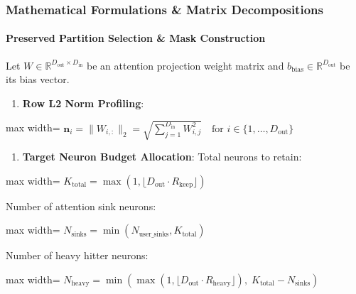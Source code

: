 \subsubsection*{Mathematical Formulations \& Matrix Decompositions}

\paragraph{Preserved Partition Selection \& Mask Construction}

Let $W \in \mathbb{R}^{D_{\text{out}} \times D_{\text{in}}}$ be an attention projection weight matrix and $b_{\text{bias}} \in \mathbb{R}^{D_{\text{out}}}$ be its bias vector.

\begin{enumerate}
\item \textbf{Row L2 Norm Profiling}:
\end{enumerate}
\begin{center}
\begin{adjustbox}{max width=\columnwidth}
$\displaystyle
\mathbf{n}_i = \| W_{i, :} \|_2 = \sqrt{ \sum_{j=1}^{D_{\text{in}}} W_{i, j}^2 } \quad \text{for } i \in \{1, \dots, D_{\text{out}}\}
$
\end{adjustbox}
\end{center}

\begin{enumerate}
\item \textbf{Target Neuron Budget Allocation}:
Total neurons to retain:
\end{enumerate}
\begin{center}
\begin{adjustbox}{max width=\columnwidth}
$\displaystyle
K_{\text{total}} = \max\left(1, \lfloor D_{\text{out}} \cdot R_{\text{keep}} \rfloor\right)
$
\end{adjustbox}
\end{center}
Number of attention sink neurons:
\begin{center}
\begin{adjustbox}{max width=\columnwidth}
$\displaystyle
N_{\text{sinks}} = \min(N_{\text{user\_sinks}}, K_{\text{total}})
$
\end{adjustbox}
\end{center}
Number of heavy hitter neurons:
\begin{center}
\begin{adjustbox}{max width=\columnwidth}
$\displaystyle
N_{\text{heavy}} = \min\left( \max\left(1, \lfloor D_{\text{out}} \cdot R_{\text{heavy}} \rfloor\right), \; K_{\text{total}} - N_{\text{sinks}} \right)
$
\end{adjustbox}
\end{center}

